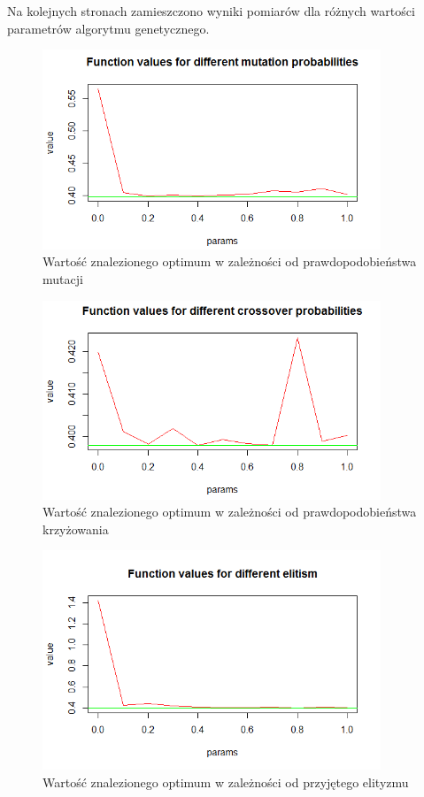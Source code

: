 \documentclass[11pt, a4paper]{article}
\newcommand{\fbi}{\leavevmode{\parindent=1em\indent}}
\begin{document}
\fbi
Na kolejnych stronach zamieszczono wyniki pomiarów dla różnych wartości parametrów algorytmu genetycznego.

\begin{figure}[H]
	\centering
	\includegraphics[width=0.9\textwidth]{./assets/branin2.png}
	\caption{Wartość znalezionego optimum w zależności od prawdopodobieństwa mutacji}
	\label{fig:branin2}
\end{figure}

\begin{figure}[H]
	\centering
	\includegraphics[width=0.9\textwidth]{./assets/branin3.png} %
	\caption{Wartość znalezionego optimum w zależności od prawdopodobieństwa krzyżowania}
	\label{fig:branin3}
\end{figure}

\begin{figure}[H]
	\centering
	\includegraphics[width=0.9\textwidth]{./assets/branin4.png} %
	\caption{Wartość znalezionego optimum w zależności od przyjętego elityzmu}
	\label{fig:branin4}
\end{figure}
\end{document}
